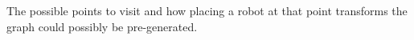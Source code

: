 The possible points to visit and how placing a robot at that point transforms the graph could possibly be pre-generated.


